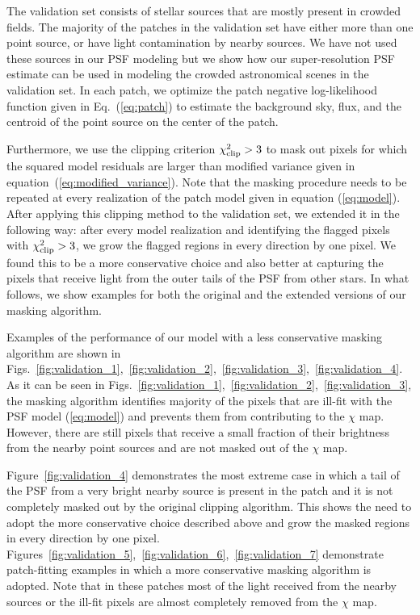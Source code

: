 The validation set consists of stellar sources that are mostly present in crowded fields. The majority of the patches in the validation set have either more than 
one point source, or have light contamination by nearby sources. We have not used these sources in our PSF modeling but we show how our super-resolution PSF estimate 
can be used in modeling the crowded astronomical scenes in the validation set. In each patch, we optimize the patch negative log-likelihood function given in Eq.~(\ref{eq:patch}) to 
estimate the background sky, flux, and the centroid of the point source on the center of the patch. 

Furthermore, we use the clipping criterion $\chi^{2}_{\rm clip}>3$ to mask out pixels for which the squared model residuals are larger than modified variance given in equation~(\ref{eq:modified_variance}).
Note that the masking procedure needs to be repeated at every realization of the patch model given in equation (\ref{eq:model}). After applying this clipping method to the validation set, we extended it in the following way: after every model realization and identifying the flagged pixels with $\chi^{2}_{\rm clip}>3$, we grow the flagged regions 
in every direction by one pixel. We found this to be a more conservative choice and also better at capturing the pixels that receive light from the outer tails of the PSF from other stars. In what follows, we show examples for both the original and the extended versions of our masking algorithm.

Examples of the performance of our model with a less conservative masking algorithm are shown in Figs.~\ref{fig:validation_1},~\ref{fig:validation_2},~\ref{fig:validation_3},~\ref{fig:validation_4}. As it can be seen in Figs.~\ref{fig:validation_1},~\ref{fig:validation_2},~\ref{fig:validation_3}, the masking algorithm identifies majority of the pixels that are ill-fit with the PSF model (\ref{eq:model}) and prevents them from contributing to the $\chi$ map. However, there are still pixels that receive a small fraction of their brightness from the nearby point sources and are not masked out of the $\chi$ map. 

Figure~\ref{fig:validation_4} demonstrates the most extreme case in which a tail of the PSF from a very bright nearby source is present in the patch and it is not completely masked out by the original clipping algorithm. This shows the need to adopt the more 
conservative choice described above and grow the masked regions in every direction by one pixel.
Figures~\ref{fig:validation_5},~\ref{fig:validation_6},~\ref{fig:validation_7} demonstrate patch-fitting examples in which a more conservative masking algorithm is adopted. Note that in these patches most of the light received from the nearby sources or the ill-fit pixels are almost completely removed from the $\chi$ map.


